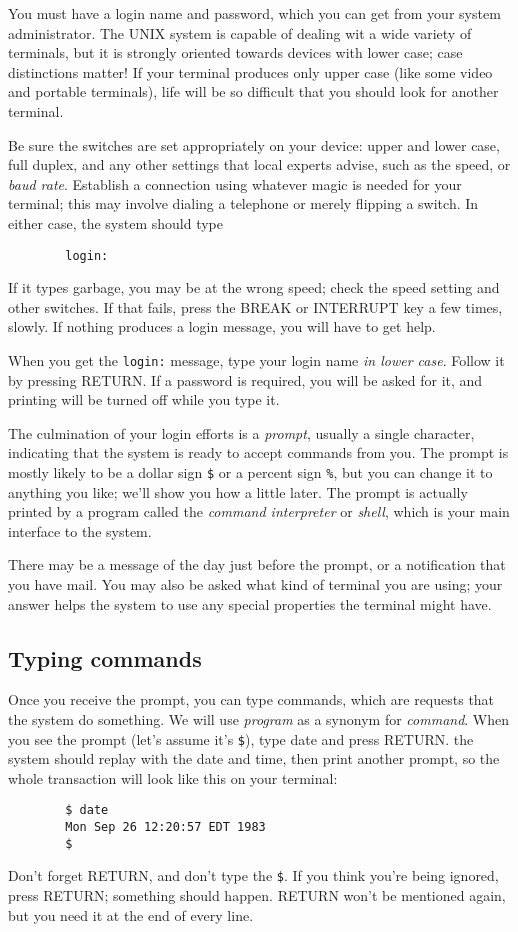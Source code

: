You must have a login name and password, which you can get from your system
administrator. The UNIX system is capable of dealing wit a wide variety of
terminals, but it is strongly oriented towards devices with lower case; case
distinctions matter! If your terminal produces only upper case (like some video
and portable terminals), life will be so difficult that you should look for
another terminal.

Be sure the switches are set appropriately on your device: upper and lower case,
full duplex, and any other settings that local experts advise, such as the
speed, or \textit{baud rate}. Establish a connection using whatever magic is
needed for your terminal; this may involve dialing a telephone or merely
flipping a switch. In either case, the system should type
\begin{verbatim}
        login:
\end{verbatim}
If it types garbage, you may be at the wrong speed; check the speed setting and
other switches. If that fails, press the BREAK or INTERRUPT key a few times,
slowly. If nothing produces a login message, you will have to get help.

When you get the \verb=login:= message, type your login name \textit{in lower
  case}. Follow it by pressing RETURN. If a password is required, you will be
asked for it, and printing will be turned off while you type it.

The culmination of your login efforts is a \textit{prompt}, usually a single
character, indicating that the system is ready to accept commands from you. The
prompt is mostly likely to be a dollar sign \verb=$= or a percent sign \verb=%=,
but you can change it to anything you like; we'll show you how a little
later. The prompt is actually printed by a program called the \textit{command
  interpreter} or \textit{shell}, which is your main interface to the system.

There may be a message of the day just before the prompt, or a notification that
you have mail. You may also be asked what kind of terminal you are using; your
answer helps the system to use any special properties the terminal might have.


\subsection{Typing commands}

Once you receive the prompt, you can type commands, which are requests that the
system do something. We will use \textit{program} as a synonym for
\textit{command}. When you see the prompt (let's assume it's \verb=$=), type
date and press RETURN. the system should replay with the date and time, then
print another prompt, so the whole transaction will look like this on your
terminal:
\begin{verbatim}
        $ date
        Mon Sep 26 12:20:57 EDT 1983
        $
\end{verbatim}
Don't forget RETURN, and don't type the \verb=$=. If you think you're being
ignored, press RETURN; something should happen. RETURN won't be mentioned again,
but you need it at the end of every line.

